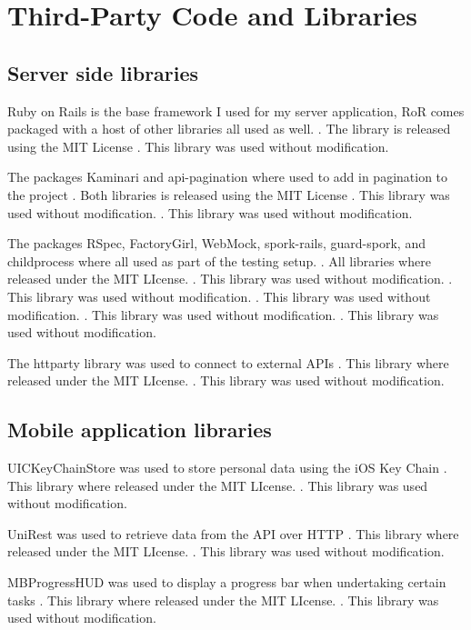 \chapter{Third-Party Code and Libraries}

\section{Server side libraries}

Ruby on Rails is the base framework I used for my server application, RoR comes packaged with a host of other libraries all used as well. 
\cite{mit}. The library is released using the MIT License 
\cite{rails}. This library was used without modification. 

The packages Kaminari and api-pagination where used to add in pagination to the project
\cite{mit}. Both libraries is released using the MIT License 
\cite{kaminari}. This library was used without modification. 
\cite{paginate}. This library was used without modification. 

The packages RSpec, FactoryGirl, WebMock, spork-rails, guard-spork, and childprocess where all used as part of the testing setup. 
\cite{mit}. All libraries where released under the MIT LIcense.
\cite{rspec}. This library was used without modification. 
\cite{FactoryGirl}. This library was used without modification. 
\cite{WebMock}. This library was used without modification. 
\cite{spork}. This library was used without modification. 
\cite{child}. This library was used without modification. 

The httparty library was used to connect to external APIs
\cite{mit}. This library where released under the MIT LIcense.
\cite{httparty}. This library was used without modification. 

\section{Mobile application libraries}

UICKeyChainStore was used to store personal data using the iOS Key Chain
\cite{mit}. This library where released under the MIT LIcense.
\cite{keychain}. This library was used without modification. 

UniRest was used to retrieve data from the API over HTTP
\cite{mit}. This library where released under the MIT LIcense.
\cite{unirest}. This library was used without modification. 

MBProgressHUD was used to display a progress bar when undertaking certain tasks
\cite{mit}. This library where released under the MIT LIcense.
\cite{progress}. This library was used without modification. 
